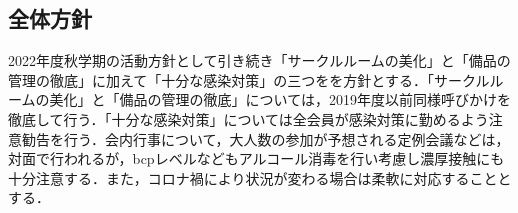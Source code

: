 \subsection*{全体方針}


2022年度秋学期の活動方針として引き続き「サークルルームの美化」と「備品の管理の徹底」に加えて「十分な感染対策」の三つをを方針とする．「サークルルームの美化」と「備品の管理の徹底」については，2019年度以前同様呼びかけを徹底して行う．「十分な感染対策」については全会員が感染対策に勤めるよう注意勧告を行う．会内行事について，大人数の参加が予想される定例会議などは，対面で行われるが，bcpレベルなどもアルコール消毒を行い考慮し濃厚接触にも十分注意する．また，コロナ禍により状況が変わる場合は柔軟に対応することとする．

